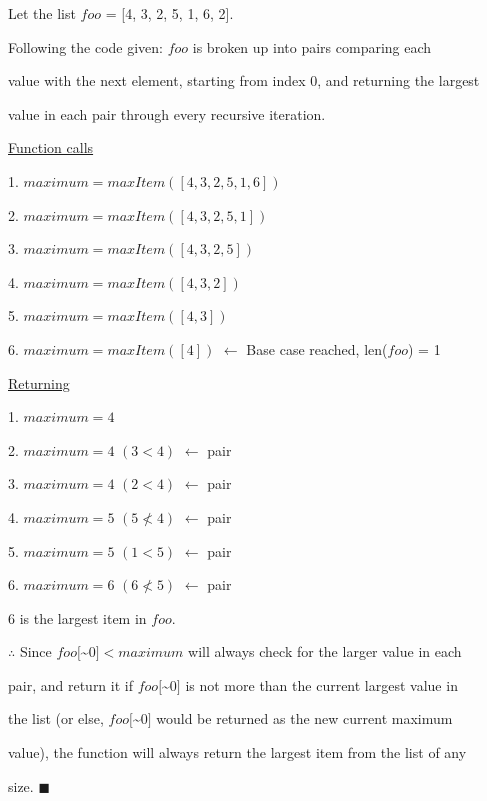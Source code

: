 \documentclass{article}
\begin{document}
Let the list $foo$ = [4, 3, 2, 5, 1, 6, 2].

\vspace{0.5cm}

Following the code given: $foo$ is broken up into pairs comparing each 

value with the next element, starting from index 0, and returning the largest 

value in each pair through every recursive iteration.

\vspace{0.5cm}

\underline{Function calls}

1. $maximum = maxItem([4,3,2,5,1,6])$

2. $maximum = maxItem([4,3,2,5,1])$

3. $maximum = maxItem([4,3,2,5])$

4. $maximum = maxItem([4,3,2])$

5. $maximum = maxItem([4,3])$

6. $maximum = maxItem([4])$ $\leftarrow$ Base case reached, len($foo$) = 1

\vspace{0.5cm}

\underline{Returning}


1. $maximum = 4$

2. $maximum = 4$ $(3 < 4)$ $\leftarrow$ pair

3. $maximum = 4$ $(2 < 4)$ $\leftarrow$ pair

4. $maximum = 5$ $(5 \not < 4)$ $\leftarrow$ pair

5. $maximum = 5$ $(1 < 5)$ $\leftarrow$ pair

6. $maximum = 6$ $(6 \not < 5)$  $\leftarrow$ pair

\vspace{0.5cm}

6 is the largest item in $foo$.

\vspace{0.2cm}

$\therefore$ Since $foo[$\textasciitilde{}$0] < maximum$ will always check for the larger value in each 

pair, and return it if $foo[$\textasciitilde{}$0]$ is not more than the current largest value in 

the list (or else, $foo[$\textasciitilde{}$0]$ would be returned as the new current maximum 

value), the function will always return the largest item from the list of any 

size. \hspace{0.5cm} $\blacksquare$
\end{document}
